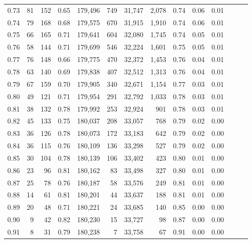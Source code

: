 \begin{tabular}{rrrrrrrrrrrrrr}
0.73 &      81 &  152 &  0.65 &  179,496 &      749 &  31,747 &   2,078 &  0.74 &  0.06 &      0.01 \\
0.74 &      79 &  168 &  0.68 &  179,575 &      670 &  31,915 &   1,910 &  0.74 &  0.06 &      0.01 \\
0.75 &      66 &  165 &  0.71 &  179,641 &      604 &  32,080 &   1,745 &  0.74 &  0.05 &      0.01 \\
0.76 &      58 &  144 &  0.71 &  179,699 &      546 &  32,224 &   1,601 &  0.75 &  0.05 &      0.01 \\
0.77 &      76 &  148 &  0.66 &  179,775 &      470 &  32,372 &   1,453 &  0.76 &  0.04 &      0.01 \\
0.78 &      63 &  140 &  0.69 &  179,838 &      407 &  32,512 &   1,313 &  0.76 &  0.04 &      0.01 \\
0.79 &      67 &  159 &  0.70 &  179,905 &      340 &  32,671 &   1,154 &  0.77 &  0.03 &      0.01 \\
0.80 &      49 &  121 &  0.71 &  179,954 &      291 &  32,792 &   1,033 &  0.78 &  0.03 &      0.01 \\
0.81 &      38 &  132 &  0.78 &  179,992 &      253 &  32,924 &     901 &  0.78 &  0.03 &      0.01 \\
0.82 &      45 &  133 &  0.75 &  180,037 &      208 &  33,057 &     768 &  0.79 &  0.02 &      0.00 \\
0.83 &      36 &  126 &  0.78 &  180,073 &      172 &  33,183 &     642 &  0.79 &  0.02 &      0.00 \\
0.84 &      36 &  115 &  0.76 &  180,109 &      136 &  33,298 &     527 &  0.79 &  0.02 &      0.00 \\
0.85 &      30 &  104 &  0.78 &  180,139 &      106 &  33,402 &     423 &  0.80 &  0.01 &      0.00 \\
0.86 &      23 &   96 &  0.81 &  180,162 &       83 &  33,498 &     327 &  0.80 &  0.01 &      0.00 \\
0.87 &      25 &   78 &  0.76 &  180,187 &       58 &  33,576 &     249 &  0.81 &  0.01 &      0.00 \\
0.88 &      14 &   61 &  0.81 &  180,201 &       44 &  33,637 &     188 &  0.81 &  0.01 &      0.00 \\
0.89 &      20 &   48 &  0.71 &  180,221 &       24 &  33,685 &     140 &  0.85 &  0.00 &      0.00 \\
0.90 &       9 &   42 &  0.82 &  180,230 &       15 &  33,727 &      98 &  0.87 &  0.00 &      0.00 \\
0.91 &       8 &   31 &  0.79 &  180,238 &        7 &  33,758 &      67 &  0.91 &  0.00 &      0.00 \\

\end{tabular}
